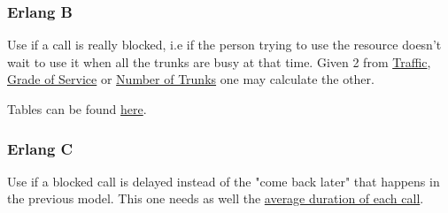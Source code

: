 \subsubsection*{Erlang B}
Use if a call is really blocked, i.e if the person trying to use the resource doesn't wait to use it when all the trunks are busy at that time. Given 2 from \ul{Traffic}, \ul{Grade of Service} or \ul{Number of Trunks} one may calculate the other.
\par Tables can be found \href{https://onlinelibrary.wiley.com/doi/pdf/10.1002/0470862696.app5}{here}.

\subsubsection*{Erlang C}
Use if a blocked call is delayed instead of the "come back later" that happens in the previous model. This one needs as well the \ul{average duration of each call}.
